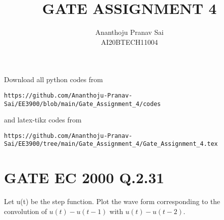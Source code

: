 \documentclass[journal,12pt,twocolumn]{IEEEtran}
\begin{document}
     \def\centbox#1{\makebox[0in]{#1}}
     \def\topbox#1{\raisebox{-\baselineskip}[0in][0in]{#1}}
     \def\midbox#1{\raisebox{-0.5\baselineskip}[0in][0in]{#1}}
\vspace{3cm}
\title{GATE ASSIGNMENT 4}
\author{Ananthoju Pranav Sai \\ AI20BTECH11004}
\maketitle
\newpage
\bigskip
\renewcommand{\thefigure}{\theenumi}
\renewcommand{\thetable}{\theenumi}
Download all python codes from 
\begin{lstlisting}
https://github.com/Ananthoju-Pranav-Sai/EE3900/blob/main/Gate_Assignment_4/codes
\end{lstlisting}
%
and latex-tikz codes from 
%
\begin{lstlisting}
https://github.com/Ananthoju-Pranav-Sai/EE3900/tree/main/Gate_Assignment_4/Gate_Assignment_4.tex
\end{lstlisting}
%
\section{GATE EC 2000 Q.2.31}
Let u(t) be the step function. Plot the wave form corresponding to the convolution of $u(t)-u(t-1)$ with $u(t)-u(t-2)$.
\end{document}
